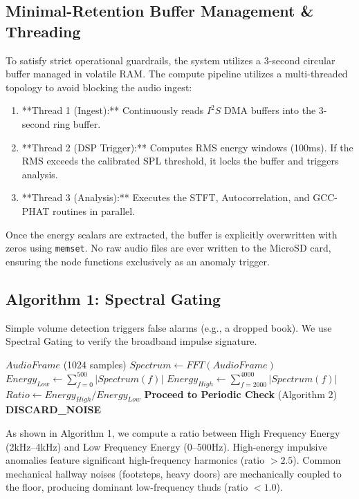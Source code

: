 \documentclass[conference]{IEEEtran}
\begin{document}
\subsection{Minimal-Retention Buffer Management \& Threading}
To satisfy strict operational guardrails, the system utilizes a 3-second circular buffer managed in volatile RAM. The compute pipeline utilizes a multi-threaded topology to avoid blocking the audio ingest:
\begin{enumerate}
    \item **Thread 1 (Ingest):** Continuously reads $I^2S$ DMA buffers into the 3-second ring buffer.
    \item **Thread 2 (DSP Trigger):** Computes RMS energy windows (100ms). If the RMS exceeds the calibrated SPL threshold, it locks the buffer and triggers analysis.
    \item **Thread 3 (Analysis):** Executes the STFT, Autocorrelation, and GCC-PHAT routines in parallel.
\end{enumerate}
Once the energy scalars are extracted, the buffer is explicitly overwritten with zeros using \texttt{memset}. No raw audio files are ever written to the MicroSD card, ensuring the node functions exclusively as an anomaly trigger.

\subsection{Algorithm 1: Spectral Gating}
Simple volume detection triggers false alarms (e.g., a dropped book). We use Spectral Gating to verify the broadband impulse signature.



\begin{algorithm}
\caption{Spectral Gating for Anomaly Verification}
\begin{algorithmic}[1]
\REQUIRE $AudioFrame$ (1024 samples)
\STATE $Spectrum \gets FFT(AudioFrame)$
\STATE $Energy_{Low} \gets \sum_{f=0}^{500} |Spectrum(f)|$ 
\STATE $Energy_{High} \gets \sum_{f=2000}^{4000} |Spectrum(f)|$ 
\STATE $Ratio \gets Energy_{High} / Energy_{Low}$
    \STATE \textbf{Proceed to Periodic Check} (Algorithm 2)
\ELSE
    \STATE \textbf{DISCARD\_NOISE}
\ENDIF
\end{algorithmic}
\label{alg:gating}
\end{algorithm}

As shown in Algorithm 1, we compute a ratio between High Frequency Energy (2kHz–4kHz) and Low Frequency Energy (0–500Hz). High-energy impulsive anomalies feature significant high-frequency harmonics (ratio $>2.5$). Common mechanical hallway noises (footsteps, heavy doors) are mechanically coupled to the floor, producing dominant low-frequency thuds (ratio $<1.0$). 
\end{document}
